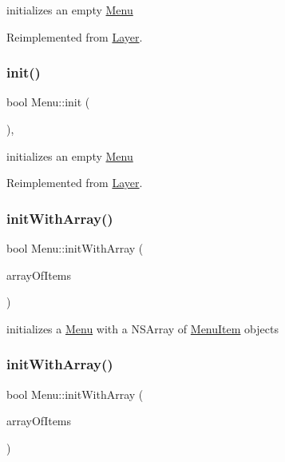 initializes an empty \hyperlink{classMenu}{Menu} 

Reimplemented from \hyperlink{classLayer}{Layer}.

\mbox{\label{classMenu_a64390e993f1abcf27799a2217a94dd38}} 
\subsubsection{\texorpdfstring{init()}{init()}\hspace{0.1cm}{\footnotesize\ttfamily [2/2]}}
{\footnotesize\ttfamily bool Menu\+::init (\begin{DoxyParamCaption}{ }\end{DoxyParamCaption})\hspace{0.3cm}{\ttfamily [override]}, {\ttfamily [virtual]}}

initializes an empty \hyperlink{classMenu}{Menu} 

Reimplemented from \hyperlink{classLayer}{Layer}.

\mbox{\label{classMenu_add7f29cf9f8be81569134a7af40f9635}} 
\subsubsection{\texorpdfstring{init\+With\+Array()}{initWithArray()}\hspace{0.1cm}{\footnotesize\ttfamily [1/2]}}
{\footnotesize\ttfamily bool Menu\+::init\+With\+Array (\begin{DoxyParamCaption}\item[{const \hyperlink{classVector}{Vector}$<$ \hyperlink{classMenuItem}{Menu\+Item} $\ast$$>$ \&}]{array\+Of\+Items }\end{DoxyParamCaption})}

initializes a \hyperlink{classMenu}{Menu} with a N\+S\+Array of \hyperlink{classMenuItem}{Menu\+Item} objects \mbox{\label{classMenu_add7f29cf9f8be81569134a7af40f9635}} 
\subsubsection{\texorpdfstring{init\+With\+Array()}{initWithArray()}\hspace{0.1cm}{\footnotesize\ttfamily [2/2]}}
{\footnotesize\ttfamily bool Menu\+::init\+With\+Array (\begin{DoxyParamCaption}\item[{const \hyperlink{classVector}{Vector}$<$ \hyperlink{classMenuItem}{Menu\+Item} $\ast$$>$ \&}]{array\+Of\+Items }\end{DoxyParamCaption})}

